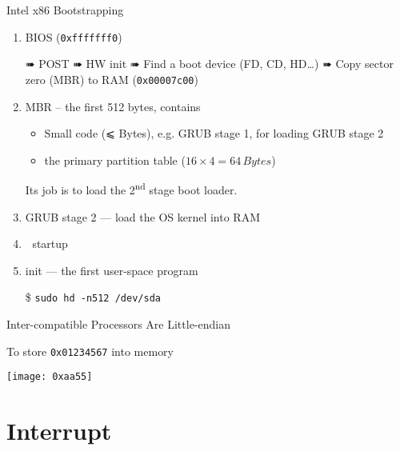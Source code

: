 \begin{frame}{Intel x86 Bootstrapping}
  \begin{enumerate}
  \item BIOS (\texttt{0xfffffff0})\\
    \begin{small}
      ➠ POST\quad
      ➠ HW init\quad
      ➠ Find a boot device (FD, CD, HD\ldots{})\quad
      ➠ Copy \alert{sector zero (MBR)} to RAM (\texttt{0x00007c00})
    \end{small}
  \item MBR -- the first 512 bytes, contains
    \begin{itemize}
    \item Small code (⩽ \unit[446]{Bytes}), e.g. GRUB stage 1, for loading GRUB stage 2
    \item the primary partition table ($16\times{}4=64\,Bytes$)
    \end{itemize}
    Its job is to load the 2\textsuperscript{nd} stage boot loader.
  \item GRUB stage 2 --- load the OS kernel into RAM
  \item {} startup
  \item init --- the first user-space program
  \end{enumerate}
  \begin{center}
  \end{center}
  \begin{itemize}
  \item[\$] \texttt{sudo hd -n512 /dev/sda}
  \end{itemize}
\end{frame}

\begin{frame}{Inter-compatible Processors Are Little-endian}
  \begin{iblock}{To store \texttt{0x01234567} into memory}
    \begin{center}
      \texttt{[image: 0xaa55]}
    \end{center}
  \end{iblock}
\end{frame}

\section{Interrupt}
\label{sec:interrupt}

